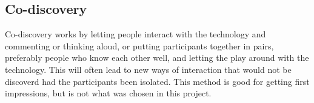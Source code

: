 \subsection{Co-discovery}
Co-discovery works by letting people interact with the technology and commenting or thinking aloud, or putting participants together in pairs, preferably people who know each other well, and letting the play around with the technology. This will often lead to new ways of interaction that would not be discoverd had the participants been isolated. This method is good for getting first impressions, but is not what was chosen in this project.